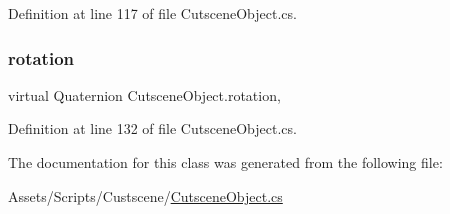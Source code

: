 Definition at line 117 of file Cutscene\+Object.\+cs.

\mbox{\label{class_cutscene_object_a746d5bfdbf4be010a5696f76c2a15255}} 
\subsubsection{\texorpdfstring{rotation}{rotation}}
{\footnotesize\ttfamily virtual Quaternion Cutscene\+Object.\+rotation\hspace{0.3cm}{\ttfamily [get]}, {\ttfamily [set]}}



Definition at line 132 of file Cutscene\+Object.\+cs.



The documentation for this class was generated from the following file\+:\begin{DoxyCompactItemize}
\item 
Assets/\+Scripts/\+Custscene/\mbox{\hyperlink{_cutscene_object_8cs}{Cutscene\+Object.\+cs}}\end{DoxyCompactItemize}
